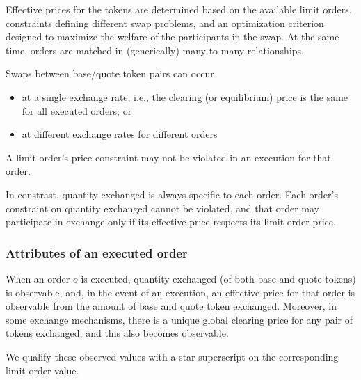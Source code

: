 \documentclass[11pt, reqno]{amsart}
\theoremstyle{definition}
\theoremstyle{remark}
\begin{document}
Effective prices for the tokens are determined based on the available limit
orders, constraints defining different swap problems, and an optimization
criterion designed to maximize the welfare of the participants in the swap.
At the same time, orders are matched in (generically) many-to-many relationships.

Swaps between base/quote token pairs can occur
\begin{itemize}
  \item at a single exchange rate, i.e., the
clearing (or equilibrium) price is the same for all executed orders; or
  \item at different exchange rates for different orders
\end{itemize}
A limit order's price constraint may not be violated in an execution for that
order.

In constrast, quantity exchanged is always specific to each order. Each
order's constraint on quantity exchanged cannot be violated, and that order
may participate in exchange only if its effective price respects its limit
order price.

\subsubsection{Attributes of an executed order}
When an order $o$ is executed, quantity exchanged (of both base and quote
tokens) is observable, and, in the event of an execution, an effective
price for that order is observable from the amount of base and quote token
exchanged. Moreover, in some exchange mechanisms, there is a unique global
clearing price for any pair of tokens exchanged, and this also becomes
observable.

We qualify these observed values with a star superscript on the
corresponding limit order value.
\end{document}

